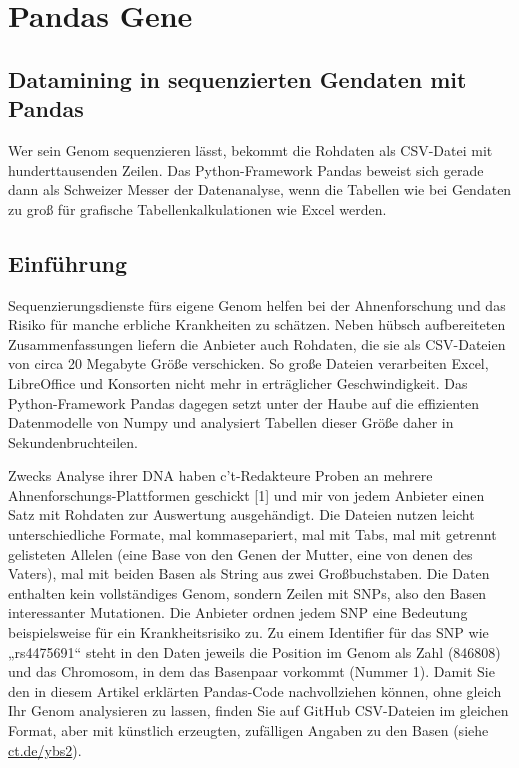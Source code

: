 %
%
%
%



\chapter{Pandas Gene}

\section{Datamining in sequenzierten Gendaten mit Pandas}

Wer sein Genom sequenzieren lässt, bekommt die Rohdaten als CSV-Datei mit hunderttausenden Zeilen. Das Python-Framework ­Pandas ­beweist sich gerade dann als ­Schweizer ­Messer der ­Datenanalyse, wenn die Tabellen wie bei Gendaten zu groß für ­grafische Tabellen­kalkulationen wie Excel werden.
	
\section{Einführung}

Sequenzierungsdienste fürs eigene Genom helfen bei der Ahnen­for­schung und das Risiko für manche erb­liche Krankheiten zu schätzen. Neben hübsch aufbereiteten Zusammenfassungen liefern die Anbieter auch Rohdaten, die sie als CSV-Dateien von circa 20 Megabyte Größe verschicken. So große Dateien verarbeiten Excel, LibreOffice und Konsorten nicht mehr in erträglicher Geschwindigkeit. Das Python-Framework Pandas dagegen setzt unter der Haube auf die effizienten Datenmodelle von Numpy und analysiert Tabellen dieser Größe daher in Sekundenbruchteilen.
	
Zwecks Analyse ihrer DNA haben c't-Redakteure Proben an mehrere Ahnenforschungs-Plattformen geschickt [1] und mir von jedem Anbieter einen Satz mit Rohdaten zur Auswertung ausgehändigt. Die Dateien nutzen leicht unterschiedliche Formate, mal kommasepariert, mal mit Tabs, mal mit getrennt gelisteten Allelen (eine Base von den Genen der Mutter, eine von denen des Vaters), mal mit beiden Basen als String aus zwei Großbuchstaben. Die Daten enthalten kein vollständiges Genom, sondern Zeilen mit SNPs, also den Basen interessanter Mutationen. Die Anbieter ordnen jedem SNP eine Bedeutung beispielsweise für ein Krankheitsrisiko zu. Zu einem Identifier für das SNP wie „rs4475691“ steht in den Daten jeweils die Position im Genom als Zahl (846808) und das Chromosom, in dem das Basenpaar vorkommt (Nummer 1). Damit Sie den in diesem Artikel erklärten Pandas-Code nachvollziehen können, ohne gleich Ihr Genom analysieren zu lassen, finden Sie auf GitHub CSV-Dateien im gleichen Format, aber mit künstlich erzeugten, zufälligen Angaben zu den Basen (siehe \textcolor{blue}{\url{ct.de/ybs2}}).
	
